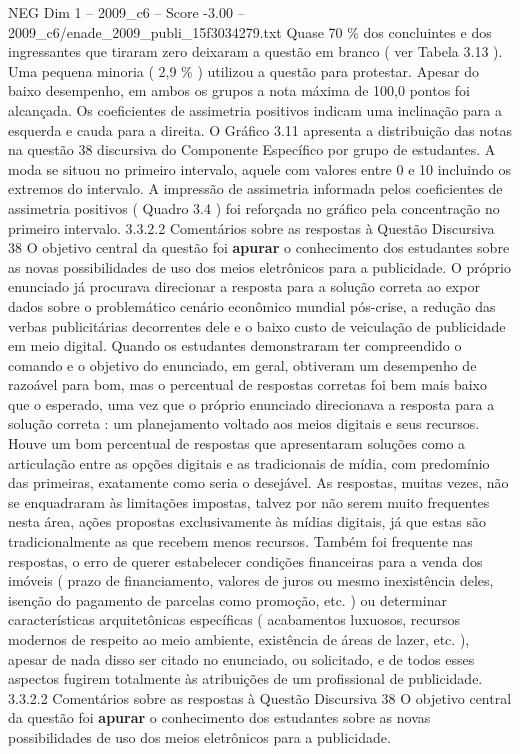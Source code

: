 \begin{textsample}{NEG Dim 1 – 2009\_c6 – Score -3.00 – 2009\_c6/enade\_2009\_publi\_15f3034279.txt}
Quase 70 \% dos concluintes e dos ingressantes que tiraram zero deixaram a questão em branco ( ver Tabela 3.13 ).
Uma pequena minoria ( 2,9 \% ) utilizou a questão para protestar.
Apesar do baixo desempenho, em ambos os grupos a nota máxima de 100,0 pontos foi alcançada.
Os coeficientes de assimetria positivos indicam uma inclinação para a esquerda e cauda para a direita.
O Gráfico 3.11 apresenta a distribuição das notas na questão 38 discursiva do Componente Específico por grupo de estudantes.
A moda se situou no primeiro intervalo, aquele com valores entre 0 e 10 incluindo os extremos do intervalo.
A impressão de assimetria informada pelos coeficientes de assimetria positivos ( Quadro 3.4 ) foi reforçada no gráfico pela concentração no primeiro intervalo. 3.3.2.2 Comentários sobre as respostas à Questão Discursiva 38 O objetivo central da questão foi \textbf{apurar} o conhecimento dos estudantes sobre as novas possibilidades de uso dos meios eletrônicos para a publicidade.
O próprio enunciado já procurava direcionar a resposta para a solução correta ao expor dados sobre o problemático cenário econômico mundial pós-crise, a redução das verbas publicitárias decorrentes dele e o baixo custo de veiculação de publicidade em meio digital.
Quando os estudantes demonstraram ter compreendido o comando e o objetivo do enunciado, em geral, obtiveram um desempenho de razoável para bom, mas o percentual de respostas corretas foi bem mais baixo que o esperado, uma vez que o próprio enunciado direcionava a resposta para a solução correta : um planejamento voltado aos meios digitais e seus recursos.
Houve um bom percentual de respostas que apresentaram soluções como a articulação entre as opções digitais e as tradicionais de mídia, com predomínio das primeiras, exatamente como seria o desejável.
As respostas, muitas vezes, não se enquadraram às limitações impostas, talvez por não serem muito frequentes nesta área, ações propostas exclusivamente às mídias digitais, já que estas são tradicionalmente as que recebem menos recursos.
Também foi frequente nas respostas, o erro de querer estabelecer condições financeiras para a venda dos imóveis ( prazo de financiamento, valores de juros ou mesmo inexistência deles, isenção do pagamento de parcelas como promoção, etc. ) ou determinar características arquitetônicas específicas ( acabamentos luxuosos, recursos modernos de respeito ao meio ambiente, existência de áreas de lazer, etc. ), apesar de nada disso ser citado no enunciado, ou solicitado, e de todos esses aspectos fugirem totalmente às atribuições de um profissional de publicidade. 3.3.2.2 Comentários sobre as respostas à Questão Discursiva 38 O objetivo central da questão foi \textbf{apurar} o conhecimento dos estudantes sobre as novas possibilidades de uso dos meios eletrônicos para a publicidade.

\end{textsample}
